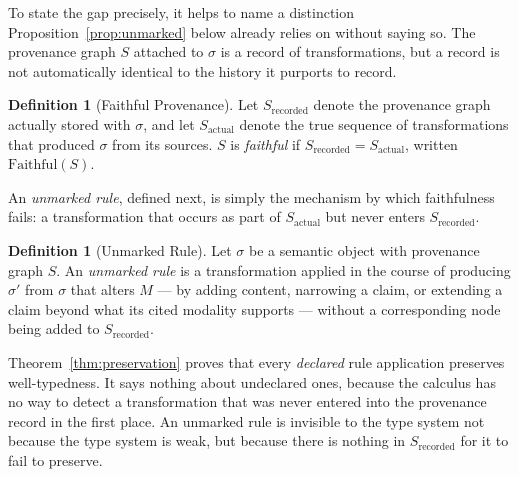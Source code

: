 \documentclass[11pt]{article}
\theoremstyle{definition}
\newtheorem{definition}[theorem]{Definition}
\begin{document}
To state the gap precisely, it helps to name a distinction Proposition~\ref{prop:unmarked} below already relies on without saying so. The provenance graph $S$ attached to $\sigma$ is a record of transformations, but a record is not automatically identical to the history it purports to record.

\begin{definition}[Faithful Provenance]
\label{def:faithful-provenance}
Let $S_{\mathrm{recorded}}$ denote the provenance graph actually stored with $\sigma$, and let $S_{\mathrm{actual}}$ denote the true sequence of transformations that produced $\sigma$ from its sources. $S$ is \emph{faithful} if $S_{\mathrm{recorded}} = S_{\mathrm{actual}}$, written $\mathrm{Faithful}(S)$.
\end{definition}

An \emph{unmarked rule}, defined next, is simply the mechanism by which faithfulness fails: a transformation that occurs as part of $S_{\mathrm{actual}}$ but never enters $S_{\mathrm{recorded}}$.

\begin{definition}[Unmarked Rule]
\label{def:unmarked-rule}
Let $\sigma$ be a semantic object with provenance graph $S$. An \emph{unmarked rule} is a transformation applied in the course of producing $\sigma'$ from $\sigma$ that alters $M$ --- by adding content, narrowing a claim, or extending a claim beyond what its cited modality supports --- without a corresponding node being added to $S_{\mathrm{recorded}}$.
\end{definition}

Theorem~\ref{thm:preservation} proves that every \emph{declared} rule application preserves well-typedness. It says nothing about undeclared ones, because the calculus has no way to detect a transformation that was never entered into the provenance record in the first place. An unmarked rule is invisible to the type system not because the type system is weak, but because there is nothing in $S_{\mathrm{recorded}}$ for it to fail to preserve.
\end{document}
